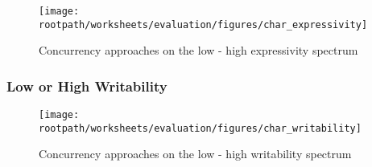 










\begin{figure}[htbp]
\centering
 \texttt{[image: \\rootpath/worksheets/evaluation/figures/char\_expressivity]} 
 \caption{Concurrency approaches on the low - high expressivity spectrum}
\label{fig:char_expressivity}
\end{figure}

\subsubsection{Low or High Writability}
\begin{figure}[htbp]
\centering
 \texttt{[image: \\rootpath/worksheets/evaluation/figures/char\_writability]} 
 \caption{Concurrency approaches on the low - high writability spectrum}
\label{fig:char_tl_writability}
\end{figure}

\worksheetend
